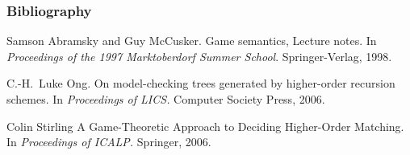 \begin{frame} \frametitle<presentation>{Bibliography}

  \begin{thebibliography}{10}
  \beamertemplatearticlebibitems
    Samson Abramsky and Guy McCusker.
    \newblock Game semantics, Lecture notes.
    \newblock In {\em Proceedings of the 1997 Marktoberdorf Summer School}. Springer-Verlag, 1998.


    C.-H.~Luke Ong.
    \newblock On model-checking trees generated by higher-order recursion schemes.
    \newblock In {\em Proceedings of LICS.} Computer Society Press, 2006.

    Colin Stirling
    \newblock A Game-Theoretic Approach to Deciding Higher-Order Matching.
    \newblock In {\em Proceedings of ICALP.} Springer, 2006.

  \end{thebibliography}
\end{frame}



